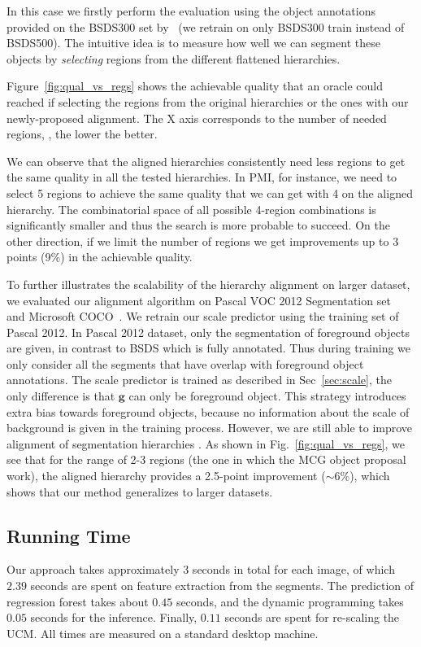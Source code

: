 In this case we firstly perform the evaluation using the object annotations
provided on the BSDS300 set by~\cite{Endres2014} (we retrain on only BSDS300 train instead of BSDS500).
The intuitive idea is to measure how well we can segment these objects by
\textit{selecting} regions from the different flattened hierarchies.

Figure~\ref{fig:qual_vs_regs} shows the achievable quality
that an oracle could reached if selecting the regions from the
original hierarchies or the ones with our newly-proposed alignment.
The X axis corresponds to the number of needed regions, \ie, the lower
the better.

We can observe that the aligned hierarchies consistently need less
regions to get the same quality in all the tested hierarchies.  In
PMI, for instance, we need to select 5 regions to achieve the same
quality that we can get with 4 on the aligned hierarchy. The
combinatorial space of all possible 4-region combinations is
significantly smaller and thus the search is more probable to
succeed. On the other direction, if we limit the number of regions we
get improvements up to 3 points (9\%) in the achievable quality.

To further illustrates the scalability of the hierarchy alignment on larger dataset, we evaluated our alignment algorithm on Pascal VOC 2012 Segmentation set~\cite{everingham2010pascal} and Microsoft COCO~\cite{lin2014microsoft}. We retrain our scale predictor using the training set of Pascal 2012. In Pascal 2012 dataset, only the segmentation of foreground objects are given, in contrast to BSDS which is fully annotated. Thus during training we only consider all the segments that have overlap with foreground object annotations. The scale predictor is trained as described in Sec~\ref{sec:scale}, the only difference is that $\mathbf{g}$ can only be foreground object. This strategy introduces extra bias towards foreground objects, because no information about the scale of background is given in the training process. However, we are still able to improve alignment of segmentation hierarchies . As shown in Fig.~\ref{fig:qual_vs_regs}, we see that for the range of 2-3 regions (the one in which the MCG object proposal work), the aligned hierarchy provides a 2.5-point improvement ($\sim$6\%), which shows that our method generalizes to larger datasets. 

\subsection{Running Time}
Our approach takes approximately 3 seconds in total for each image, of which $2.39$
seconds are spent on feature extraction from the segments. The prediction
of regression forest takes about $0.45$ seconds, and the dynamic
programming takes $0.05$ seconds for the inference. Finally, $0.11$
seconds are spent for re-scaling the UCM.
All times are measured on a standard desktop machine.

